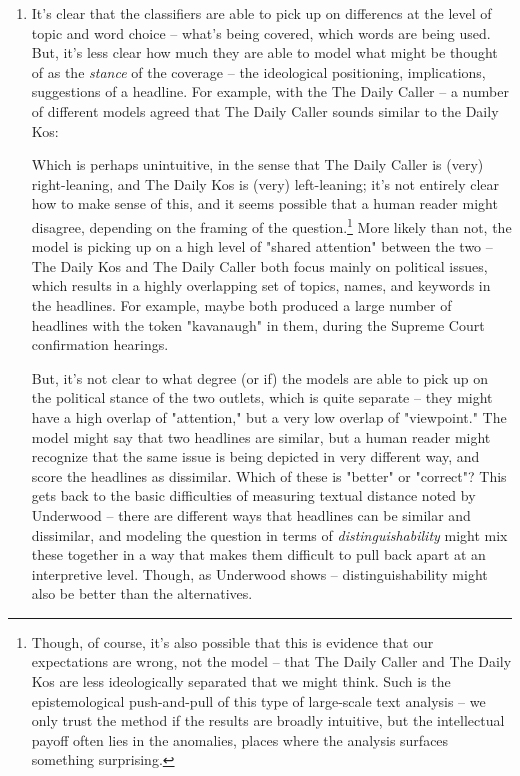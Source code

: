 \documentclass{scrartcl}
\begin{document}
\begin{enumerate}
\item It's clear that the classifiers are able to pick up on differencs at the level of topic and word choice -- what's being covered, which words are being used. But, it's less clear how much they are able to model what might be thought of as the \textit{stance} of the coverage -- the ideological positioning, implications, suggestions of a headline. For example, with the The Daily Caller -- a number of different models agreed that The Daily Caller sounds similar to the Daily Kos:


Which is perhaps unintuitive, in the sense that The Daily Caller is (very) right-leaning, and The Daily Kos is (very) left-leaning; it's not entirely clear how to make sense of this, and it seems possible that a human reader might disagree, depending on the framing of the question.\footnote{Though, of course, it's also possible that this is evidence that our expectations are wrong, not the model -- that The Daily Caller and The Daily Kos are less ideologically separated that we might think. Such is the epistemological push-and-pull of this type of large-scale text analysis -- we only trust the method if the results are broadly intuitive, but the intellectual payoff often lies in the anomalies, places where the analysis surfaces something surprising.} More likely than not, the model is picking up on a high level of "shared attention" between the two -- The Daily Kos and The Daily Caller both focus mainly on political issues, which results in a highly overlapping set of topics, names, and keywords in the headlines. For example, maybe both produced a large number of headlines with the token "kavanaugh" in them, during the Supreme Court confirmation hearings.

But, it's not clear to what degree (or if) the models are able to pick up on the political stance of the two outlets, which is quite separate -- they might have a high overlap of "attention," but a very low overlap of "viewpoint." The model might say that two headlines are similar, but a human reader might recognize that the same issue is being depicted in very different way, and score the headlines as dissimilar. Which of these is "better" or "correct"? This gets back to the basic difficulties of measuring textual distance noted by Underwood -- there are different ways that headlines can be similar and dissimilar, and modeling the question in terms of \textit{distinguishability} might mix these together in a way that makes them difficult to pull back apart at an interpretive level. Though, as Underwood shows -- distinguishability might also be better than the alternatives.


\end{enumerate}
\end{document}
